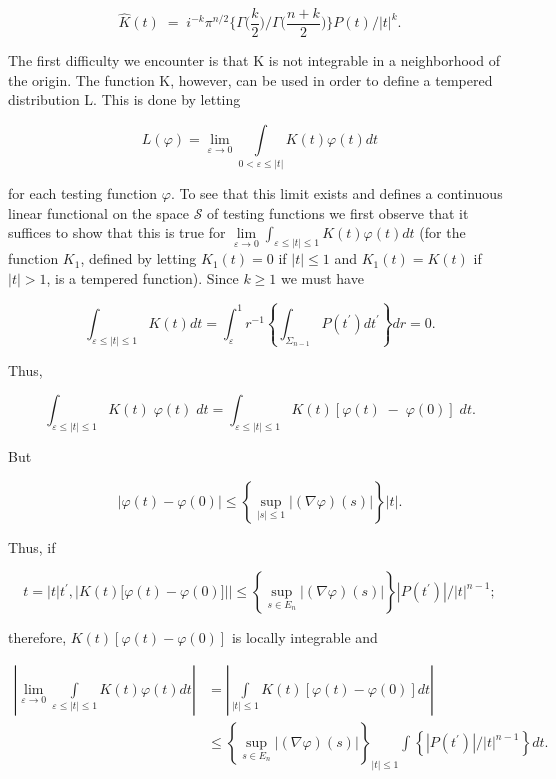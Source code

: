 \[
\hat{K}(t)\;=\;i^{-k}\pi^{n/2}\biggl\{\Gamma\biggl(\frac{k}{2}\biggl)\biggr/\Gamma\biggl(\frac{n+k}{2}\biggl)\biggr\}P(t)/|t|^{k}.
\]

The first difficulty we encounter is that K is not integrable in a neighborhood of the origin. The function K, however, can be used in order to define a tempered distribution L. This is done by letting

\begin{equation}\label{eq:c4-4-4}
L(\varphi)=\lim_{\varepsilon\to0}\int\limits_{0<\varepsilon\leq|t|}K(t)\varphi(t)dt
\end{equation}

for each testing function $\varphi$. To see that this limit exists and defines a continuous linear functional on the space $\mathcal{S}$ of testing functions we first observe that it suffices to show that this is true for $\lim\limits_{\varepsilon\to0}\int_{\varepsilon\leq|t|\leq1}K(t)\varphi(t)dt$ (for the function $K_1$, defined by letting $K_1(t)=0$ if $|t|\leq1$ and $K_1(t)=K(t)$ if $|t|>1$, is a tempered function). Since $k\geq1$ we must have

\[
\int_{\varepsilon\leq|t|\leq1}K(t)dt=\int_{\varepsilon}^{1}r^{-1}\left\{\int_{\Sigma_{n-1}}P(t^{\prime})dt^{\prime}\right\}dr=0.
\]

Thus,

\[
\int_{\varepsilon\leq|t|\leq1}K(t)\;\varphi(t)\;{d}t=\int_{\varepsilon\leq|t|\leq1}K(t)[\varphi(t)\;-\;\varphi(0)]\;{d}t.
\]

But

\[
\left|\varphi(t)-\varphi(0)\right|\leq\left\{\sup_{|s|\leq1}\left|(\nabla\varphi)(s)\right|\right\}\big|t\big|.
\]

Thus, if

\[
t=\left|t\right|t^{\prime},\left|K(t)[\varphi(t)\right.-\varphi(0)]\left|\right|\leq\left\{\sup_{s\in E_{n}}\left|(\nabla\varphi)(s)\right|\right\}\left|P(t^{\prime})\right|/\left|t\right|^{n-1};
\]

therefore, $K(t)[\varphi(t) - \varphi(0)]$ is locally integrable and

\[
\begin{aligned}\left|\lim_{\varepsilon\to0}\int\limits_{\varepsilon\leq|t|\leq1}K(t)\varphi(t)dt\right|&=\left|\int\limits_{|t|\leq1}K(t)[\varphi(t)-\varphi(0)]dt\right|\\&\leq\left\{\sup_{s\in E_{n}}\left|(\nabla\varphi)(s)\right|\right\}_{|t|\leq1}\int\left\{|P(t^{\prime})|/|t|^{n-1}\right\}dt.\end{aligned}
\]

